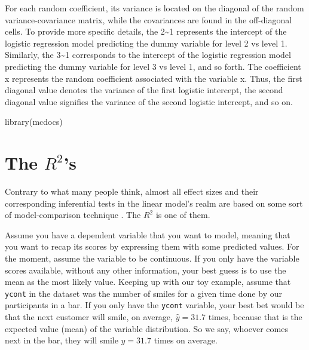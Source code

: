 \documentclass[
]{book}
\newenvironment{Shaded}{\begin{snugshade}}{\end{snugshade}}
\newcommand{\FunctionTok}[1]{\textcolor[rgb]{0.00,0.00,0.00}{#1}}
\newcommand{\NormalTok}[1]{#1}
\newlength{\cslhangindent}
\newlength{\cslentryspacingunit} %
\newenvironment{CSLReferences}[2] %
 {%
  \setlength{\parindent}{0pt}
  \ifodd #1
  \let\oldpar\par
  \def\par{\hangindent=\cslhangindent\oldpar}
  \fi
  \setlength{\parskip}{#2\cslentryspacingunit}
 }%
 {}
\begin{document}
For each random coefficient, its variance is located on the diagonal of the random variance-covariance matrix, while the covariances are found in the off-diagonal cells. To provide more specific details, the 2\textasciitilde1 represents the intercept of the logistic regression model predicting the dummy variable for level 2 vs level 1. Similarly, the 3\textasciitilde1 corresponds to the intercept of the logistic regression model predicting the dummy variable for level 3 vs level 1, and so forth. The coefficient x represents the random coefficient associated with the variable x. Thus, the first diagonal value denotes the variance of the first logistic intercept, the second diagonal value signifies the variance of the second logistic intercept, and so on.

\hypertarget{refs}{}
\begin{CSLReferences}{0}{0}
\end{CSLReferences}

\hypertarget{appendix-appendix}{%
\appendix}


\begin{Shaded}
\begin{Highlighting}[]
\FunctionTok{library}\NormalTok{(mcdocs)}
\end{Highlighting}
\end{Shaded}

\hypertarget{appendixa}{%
\chapter{\texorpdfstring{The \(R^2\)'s}{The R\^{}2's}}\label{appendixa}}

Contrary to what many people think, almost all effect sizes and their corresponding inferential tests in the linear model's realm are based on some sort of model-comparison technique \citep{judd2017data}. The \(R^2\) is one of them.

Assume you have a dependent variable that you want to model, meaning that you want to recap its scores by expressing them with some predicted values. For the moment, assume the variable to be continuous. If you only have the variable scores available, without any other information, your best guess is to use the mean as the most likely value. Keeping up with our toy example, assume that \texttt{ycont} in the dataset was the number of smiles for a given time done by our participants in a bar. If you only have the \texttt{ycont} variable, your best bet would be that the next customer will smile, on average, \(\hat{y}=31.7\) times, because that is the expected value (mean) of the variable distribution. So we say, whoever comes next in the bar, they will smile \(\hat{y}=31.7\) times on average.
\end{document}
